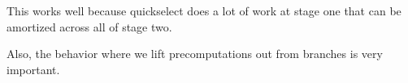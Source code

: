 This works well because quickselect does a lot of work at stage one that can be amortized across all of stage two.

Also, the behavior where we lift precomputations out from branches is very important.

%
%
%
%
